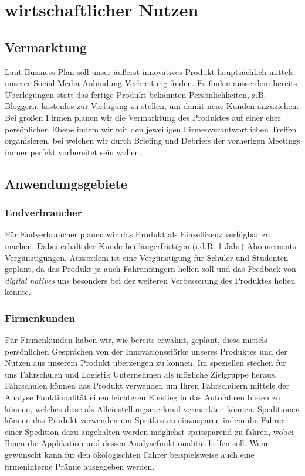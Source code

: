 \chapter{wirtschaftlicher Nutzen}

\section{Vermarktung}
Laut Business Plan soll unser äußerst innovatives Produkt hauptsächlich mittels unserer Social Media Anbindung Verbreitung finden. Es finden ausserdem bereits Überlegungen statt das fertige Produkt bekannten Persönlichkeiten, z.B. Bloggern, kostenlos zur Verfügung zu stellen, um damit neue Kunden anzuziehen.
\newline
Bei großen Firmen planen wir die Vermarktung des Produktes auf einer eher persönlichen Ebene indem wir mit den jeweiligen Firmenverantwortlichen Treffen organisieren, bei welchen wir durch Briefing und Debriefs der vorherigen Meetings immer perfekt vorbereitet sein wollen.
\section{Anwendungsgebiete}
\subsection{Endverbraucher}
Für Endverbraucher planen wir das Produkt als Einzellizenz verfügbar zu machen. Dabei erhält der Kunde bei längerfristigen (i.d.R. 1 Jahr) Abonnements Vergünstigungen. Ausserdem ist eine Vergünstigung für Schüler und Studenten geplant, da das Produkt ja auch Fahranfängern helfen soll und das Feedback von \textit{digital natives} uns besonders bei der weiteren Verbesserung des Produktes helfen könnte.
\subsection{Firmenkunden}
Für Firmenkunden haben wir, wie bereits erwähnt, geplant, diese mittels persönlichen Gesprächen von der Innovationsstärke unseres Produktes und der Nutzen aus unserem Produkt überzeugen zu können. 
Im speziellen stechen für uns Fahrschulen und Logistik Unternehmen als mögliche Zielgruppe heraus. 
\newline
Fahrschulen können das Produkt verwenden um Ihren Fahrschülern  mittels der Analyse Funktionalität einen leichteren Einstieg in das Autofahren bieten zu können, welches diese als Alleinstellungsmerkmal vermarkten können.
\newline
Speditionen können das Produkt verwenden um Spritkosten einzusparen indem die Fahrer einer Spedition dazu angehalten werden möglichst spritsparend zu fahren, wobei Ihnen die Applikation und dessen Analysefunktionalität helfen soll. Wenn gewünscht kann für den ökologischten Fahrer beispielsweise auch eine firmeninterne Prämie ausgegeben werden.